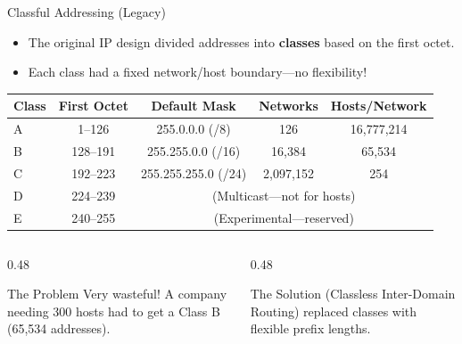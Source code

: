 \documentclass[aspectratio=169]{beamer}  %
\begin{document}
\begin{frame}{Classful Addressing (Legacy)}
    \begin{itemize}
        \item The original IP design divided addresses into \textbf{classes} based on the first octet.
        \item Each class had a fixed network/host boundary---no flexibility!
    \end{itemize}
    
    \vspace{0.3em}
    \begin{center}
        \begin{tabular}{l c c c c}
            \toprule
            \textbf{Class} & \textbf{First Octet} & \textbf{Default Mask} & \textbf{Networks} & \textbf{Hosts/Network} \\
            \midrule
            \rowcolor{ipblue!15}
            A & 1--126 & 255.0.0.0 (/8) & 126 & 16,777,214 \\
            \rowcolor{networkgreen!15}
            B & 128--191 & 255.255.0.0 (/16) & 16,384 & 65,534 \\
            \rowcolor{aborange!15}
            C & 192--223 & 255.255.255.0 (/24) & 2,097,152 & 254 \\
            D & 224--239 & \multicolumn{3}{c}{(Multicast---not for hosts)} \\
            E & 240--255 & \multicolumn{3}{c}{(Experimental---reserved)} \\
            \bottomrule
        \end{tabular}
    \end{center}
    
    \vspace{0.3em}
    \begin{columns}[T]
        \begin{column}{0.48\textwidth}
            \begin{alertblock}{The Problem}
                Very wasteful! A company needing 300 hosts had to get a Class B (65,534 addresses).
            \end{alertblock}
        \end{column}
        \begin{column}{0.48\textwidth}
            \begin{exampleblock}{The Solution}
                 (Classless Inter-Domain Routing) replaced classes with flexible prefix lengths.
            \end{exampleblock}
        \end{column}
    \end{columns}
\end{frame}
\end{document}
